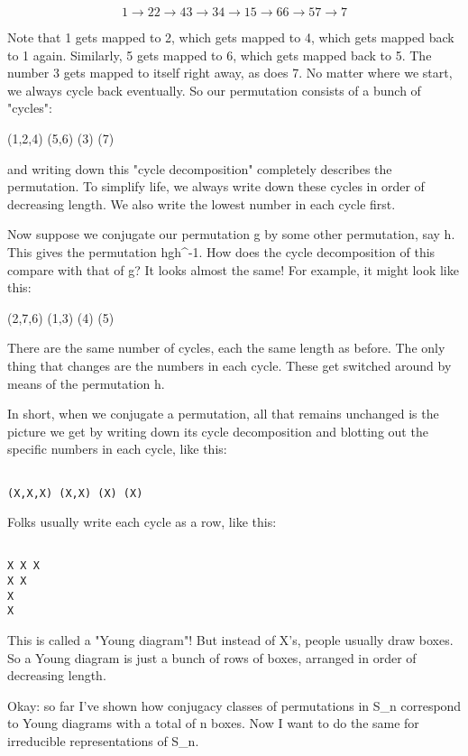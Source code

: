 $$

1 \to  2
2 \to  4 
3 \to  3
4 \to  1
5 \to  6
6 \to  5
7 \to  7
$$
    
Note that 1 gets mapped to 2, which gets mapped to 4, which gets mapped
back to 1 again.   Similarly, 5 gets mapped to 6, which gets mapped back
to 5.  The number 3 gets mapped to itself right away, as does 7.  No matter 
where we start, we always cycle back eventually.  So our permutation
consists of a bunch of "cycles":

(1,2,4) (5,6) (3) (7)

and writing down this "cycle decomposition" completely describes the
permutation.   To simplify life, we always write down these cycles in
order of decreasing length.  We also write the lowest number in each
cycle first.  

Now suppose we conjugate our permutation g by some other permutation,
say h.  This gives the permutation hgh^{-1}.  How does the cycle
decomposition of this compare with that of g?  It looks almost the same!
For example, it might look like this:

(2,7,6) (1,3) (4) (5)

There are the same number of cycles, each the same length as before. 
The only thing that changes are the numbers in each cycle.  These get
switched around by means of the permutation h.  

In short, when we conjugate a permutation, all that remains unchanged is
the picture we get by writing down its cycle decomposition and blotting
out the specific numbers in each cycle, like this:


\begin{verbatim}

(X,X,X) (X,X) (X) (X)
\end{verbatim}
    
Folks usually write each cycle as a row, like this:


\begin{verbatim}

X X X
X X
X
X
\end{verbatim}
    
This is called a "Young diagram"!  But instead of X's, people
usually draw boxes.  So a Young diagram is just a bunch of rows of
boxes, arranged in order of decreasing length.

Okay: so far I've shown how conjugacy classes of permutations in S_{n}
correspond to Young diagrams with a total of n boxes.  Now I want to do
the same for irreducible representations of S_{n}.  

